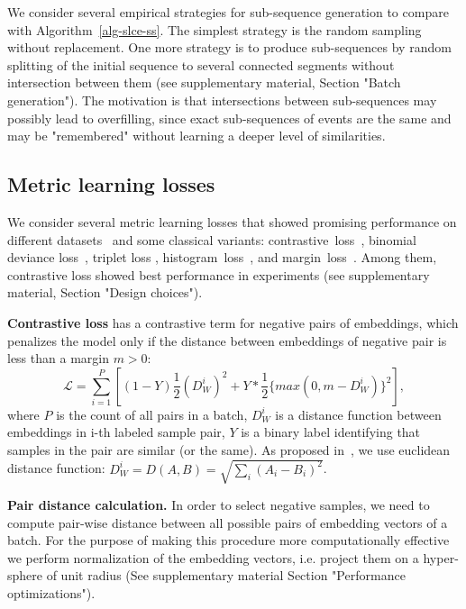 \documentclass{article}
\begin{document}
We consider several empirical strategies for sub-sequence generation to compare with Algorithm~\ref{alg-slce-ss}. The simplest strategy is the random sampling without replacement.
One more strategy is to produce sub-sequences by random splitting of the initial sequence to several connected segments without intersection between them
(see supplementary material, Section "Batch generation"). The motivation is that intersections between sub-sequences may possibly lead to overfilling, since exact sub-sequences of events are the same and may be "remembered" without learning a deeper level of similarities.



\subsection{Metric learning losses} \label{sec-ml-loss}

We consider several metric learning losses that showed promising performance on different datasets~\cite{Kaya2019DeepML} and some classical variants: contrastive~loss~\cite{Hadsell2006DimensionalityRB}, binomial deviance loss~\cite{Yi2014DeepML}, triplet loss \cite{Hoffer2015DeepML}, histogram~loss~\cite{Ustinova2016LearningDE}, and margin~loss~\cite{Manmatha2017SamplingMI}. Among them, contrastive loss showed best performance in experiments (see supplementary material, Section "Design choices").

\textbf{Contrastive loss} has a contrastive term for negative pairs of embeddings, which penalizes the model only if the distance between embeddings of negative pair is less than a margin $m>0$:  
\begin{equation}
 \mathcal{L} = \sum_{i=1}^P \left[ (1-Y)\frac{1}{2}(D_W^i)^2 +Y*\frac{1}{2}\{max(0,m-D_W^i)\}^2 \right],
\end{equation}
where $P$ is the count of all pairs in a batch, $D_W^i$ is a distance function between embeddings in i-th labeled sample pair, $Y$ is a binary label identifying that samples in the pair are similar (or the same).
As proposed in~\cite{Hadsell2006DimensionalityRB}, we use euclidean distance function: $D_W^i = D(A,B) = \sqrt{\sum_i(A_i - B_i)^2}$.

\textbf{Pair distance calculation.} In order to select negative samples, we need to compute pair-wise distance between all possible pairs of embedding vectors of a batch. For the purpose of making this procedure more computationally effective we perform normalization of the embedding vectors, i.e. project them on a hyper-sphere of unit radius (See supplementary material Section "Performance optimizations").
\end{document}
